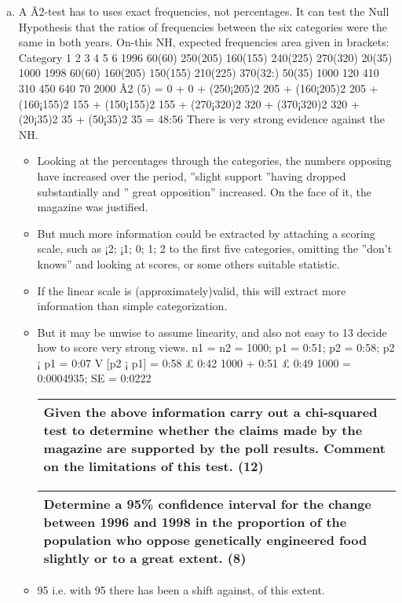 \documentclass[a4paper,12pt]{article}
\begin{document}
\begin{enumerate}[(a)]
\item A Â2-test has to uses exact frequencies, not percentages. It can test the Null Hypothesis
that the ratios of frequencies between the six categories were the same in both years. On-this
NH, expected frequencies area given in brackets:
Category 1 2 3 4 5 6
1996 60(60) 250(205) 160(155) 240(225) 270(320) 20(35) 1000
1998 60(60) 160(205) 150(155) 210(225) 370(32:) 50(35) 1000
120 410 310 450 640 70 2000
Â2
(5) = 0 + 0 + (250¡205)2
205 + (160¡205)2
205 + (160¡155)2
155 + (150¡155)2
155 + (270¡320)2
320 + (370¡320)2
320 +
(20¡35)2
35 + (50¡35)2
35 = 48:56
There is very strong evidence against the NH.

\begin{itemize}
\item Looking at the percentages through the categories, the numbers opposing have increased over
the period, ”slight support ”having dropped substantially and ” great opposition” increased.
On the face of it, the magazine was justified.
\item But much more information could be extracted by attaching a scoring scale, such as ¡2; ¡1; 0;
1; 2 to the first five categories, omitting the ”don’t knows” and looking at scores, or some others
suitable statistic. 
\item If the linear scale is (approximately)valid, this will extract more information
than simple categorization. 
\item But it may be unwise to assume linearity, and also not easy to
13
decide how to score very strong views.
n1 = n2 = 1000; p1 = 0:51; p2 = 0:58; p2 ¡ p1 = 0:07
V [p2 ¡ p1] =
0:58 £ 0:42
1000
+
0:51 £ 0:49
1000
= 0:0004935; SE = 0:0222

  \begin{table}[ht!]
 \centering
 \begin{tabular}{|p{15cm}|}
 \hline  
Given the above information carry out a chi-squared test to determine whether the claims made by the magazine are supported by the poll results.  Comment on the limitations of this test. (12) 
 
\\ \hline
  \end{tabular}
\end{table}
  \begin{table}[ht!]
 \centering
 \begin{tabular}{|p{15cm}|}
 \hline  
Determine a 95\% confidence interval for the change between 1996 and 1998 in the proportion of the population who oppose genetically engineered food slightly or to a great extent. (8) \\ \hline
  \end{tabular}
\end{table}
\item 95%
i.e. with 95%
there has been a shift against, of this extent.
\end{itemize}
\end{enumerate}
\end{document}
